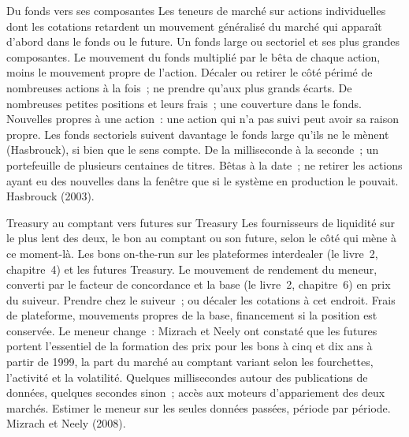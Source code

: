\begin{strategyfile}{Du fonds vers ses composantes}\label{strat:hf:lead-lag-and-cross-venue-trading:etf}
 Les teneurs de marché sur actions individuelles dont les cotations retardent un mouvement généralisé du marché qui apparaît d'abord dans le fonds ou le future.
 Un fonds large ou sectoriel et ses plus grandes composantes.
 Le mouvement du fonds multiplié par le bêta de chaque action, moins le mouvement propre de l'action.
 Décaler ou retirer le côté périmé de nombreuses actions à la fois~; ne prendre qu'aux plus grands écarts.
 De nombreuses petites positions et leurs frais~; une couverture dans le fonds.
 Nouvelles propres à une action~: une action qui n'a pas suivi peut avoir sa raison propre. Les fonds sectoriels suivent davantage le fonds large qu'ils ne le mènent
(Hasbrouck), si bien que le sens compte.
 De la milliseconde à la seconde~; un portefeuille de plusieurs centaines de titres.
 Bêtas à la date~; ne retirer les actions ayant eu des nouvelles dans la fenêtre que si le système en production le pouvait.
 Hasbrouck (2003).
\end{strategyfile}

\begin{strategyfile}{Treasury au comptant vers futures sur Treasury}\label{strat:hf:lead-lag-and-cross-venue-trading:treasury}
 Les fournisseurs de liquidité sur le plus lent des deux, le bon au comptant ou son future, selon le côté qui mène à ce moment-là.
 Les bons on-the-run sur les plateformes interdealer (le livre~2, chapitre~4) et les futures Treasury.
 Le mouvement de rendement du meneur, converti par le facteur de concordance et la base (le livre~2, chapitre~6) en prix du suiveur.
 Prendre chez le suiveur~; ou décaler les cotations à cet endroit.
 Frais de plateforme, mouvements propres de la base, financement si la position est conservée.
 Le meneur change~: Mizrach et Neely ont constaté que les futures portent l'essentiel de la formation des prix pour les bons à cinq et dix ans à partir de 1999,
la part du marché au comptant variant selon les fourchettes, l'activité et la volatilité.
 Quelques millisecondes autour des publications de données, quelques secondes sinon~; accès aux moteurs d'appariement des deux marchés.
 Estimer le meneur sur les seules données passées, période par période.
 Mizrach et Neely (2008).
\end{strategyfile}

